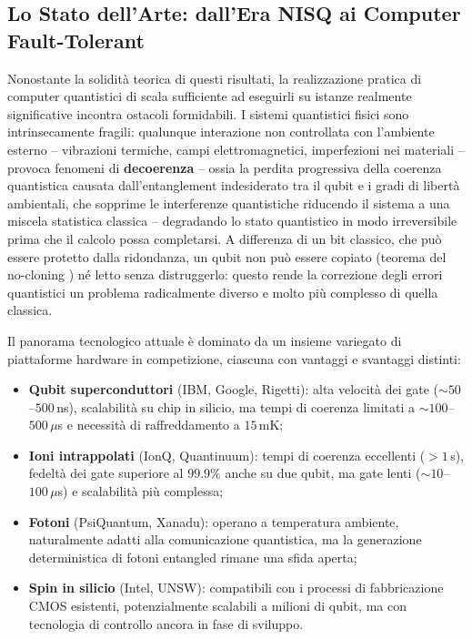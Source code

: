 \begin{onehalfspace}
\clearpage
\subsection{Lo Stato dell'Arte: dall'Era NISQ ai Computer Fault-Tolerant}
\label{app:intro:nisq}

Nonostante la solidità teorica di questi risultati, la realizzazione pratica di computer quantistici di scala sufficiente ad eseguirli su istanze realmente significative incontra ostacoli formidabili. I sistemi quantistici fisici sono intrinsecamente fragili: qualunque interazione non controllata con l'ambiente esterno -- vibrazioni termiche, campi elettromagnetici, imperfezioni nei materiali -- provoca fenomeni di \textbf{decoerenza} -- ossia la perdita progressiva della coerenza quantistica causata dall'entanglement indesiderato tra il qubit e i gradi di libertà ambientali, che sopprime le interferenze quantistiche riducendo il sistema a una miscela statistica classica -- degradando lo stato quantistico in modo irreversibile prima che il calcolo possa completarsi. A differenza di un bit classico, che può essere protetto dalla ridondanza, un qubit non può essere copiato (teorema del no-cloning \cite{wootters1982}) né letto senza distruggerlo: questo rende la correzione degli errori quantistici un problema radicalmente diverso e molto più complesso di quella classica.

Il panorama tecnologico attuale è dominato da un insieme variegato di piattaforme hardware in competizione, ciascuna con vantaggi e svantaggi distinti:

\begin{itemize}
    \item \textbf{Qubit superconduttori} (IBM, Google, Rigetti): alta velocità dei gate ($\sim 50$--$500\,$ns), scalabilità su chip in silicio, ma tempi di coerenza limitati a $\sim 100$--$500\,\mu$s e necessità di raffreddamento a $15\,\text{mK}$;
    \item \textbf{Ioni intrappolati} (IonQ, Quantinuum): tempi di coerenza eccellenti ($>1\,$s), fedeltà dei gate superiore al $99.9\%$ anche su due qubit, ma gate lenti ($\sim 10$--$100\,\mu$s) e scalabilità più complessa;
    \item \textbf{Fotoni} (PsiQuantum, Xanadu): operano a temperatura ambiente, naturalmente adatti alla comunicazione quantistica, ma la generazione deterministica di fotoni entangled rimane una sfida aperta;
    \item \textbf{Spin in silicio} (Intel, UNSW): compatibili con i processi di fabbricazione CMOS esistenti, potenzialmente scalabili a milioni di qubit, ma con tecnologia di controllo ancora in fase di sviluppo.
\end{itemize}


\end{onehalfspace}
